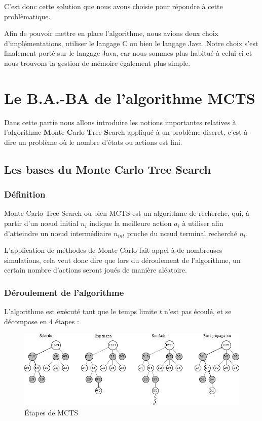 \documentclass[pdftex,french, english]{article}	%
\begin{document}
	C'est donc cette solution que nous avons choisie pour répondre à cette problèmatique. 

	Afin de pouvoir mettre en place l'algorithme, nous avions deux choix d'implémentations, utiliser le langage C ou bien le langage Java. 
	Notre choix s'est finalement porté sur le langage Java, car nous sommes plus habitué à celui-ci et nous trouvons la gestion de mémoire également plus simple.

\section{Le B.A.-BA de l'algorithme MCTS}

	Dans cette partie nous allons introduire les notions importantes relatives à l'algorithme \textbf{M}onte \textbf{C}arlo \textbf{T}ree \textbf{S}earch \cite{coulom01}
	appliqué à un problème discret, c'est-à-dire un problème où le nombre d'états ou actions est fini.

	\subsection{Les bases du Monte Carlo Tree Search}
	\subsubsection{Définition}
	Monte Carlo Tree Search ou bien MCTS est un algorithme de recherche, qui, à partir d'un nœud initial $n_{i}$ indique la meilleure action $a_i$ à utiliser afin d'atteindre un nœud intermédiaire $n_{int}$ proche du nœud terminal recherché $n_{t}$. 

	L'application de méthodes de Monte Carlo fait appel à de nombreuses simulations, cela veut donc dire que lors du déroulement de l'algorithme, un certain nombre d'actions seront joués de manière aléatoire.
	\subsubsection{Déroulement de l'algorithme}
	L'algorithme est exécuté tant que le temps limite $t$ n'est pas écoulé, et se décompose en 4 étapes :
	\begin{figure}[h]
		\centering
		\includegraphics[width=\textwidth]{etapes.png}
		\caption{ Étapes de MCTS}
		 \label{fig:mcts}
	\end{figure}
\end{document}
